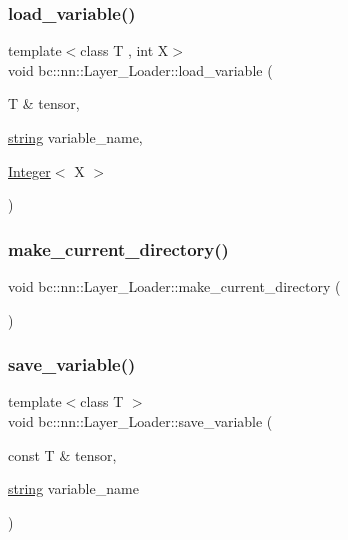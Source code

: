 \subsubsection{\texorpdfstring{load\+\_\+variable()}{load\_variable()}\hspace{0.1cm}{\footnotesize\ttfamily [4/4]}}
{\footnotesize\ttfamily template$<$class T , int X$>$ \\
void bc\+::nn\+::\+Layer\+\_\+\+Loader\+::load\+\_\+variable (\begin{DoxyParamCaption}\item[{T \&}]{tensor,  }\item[{\hyperlink{structbc_1_1string}{string}}]{variable\+\_\+name,  }\item[{\hyperlink{structbc_1_1traits_1_1Integer}{Integer}$<$ X $>$}]{ }\end{DoxyParamCaption})\hspace{0.3cm}{\ttfamily [inline]}}

\mbox{\label{structbc_1_1nn_1_1Layer__Loader_accce0f02309037abf68531b2b9f2c13d}} 
\subsubsection{\texorpdfstring{make\+\_\+current\+\_\+directory()}{make\_current\_directory()}}
{\footnotesize\ttfamily void bc\+::nn\+::\+Layer\+\_\+\+Loader\+::make\+\_\+current\+\_\+directory (\begin{DoxyParamCaption}{ }\end{DoxyParamCaption})\hspace{0.3cm}{\ttfamily [inline]}}

\mbox{\label{structbc_1_1nn_1_1Layer__Loader_a41c022ea61234a753938fcc139a2ae85}} 
\subsubsection{\texorpdfstring{save\+\_\+variable()}{save\_variable()}}
{\footnotesize\ttfamily template$<$class T $>$ \\
void bc\+::nn\+::\+Layer\+\_\+\+Loader\+::save\+\_\+variable (\begin{DoxyParamCaption}\item[{const T \&}]{tensor,  }\item[{\hyperlink{structbc_1_1string}{string}}]{variable\+\_\+name }\end{DoxyParamCaption})\hspace{0.3cm}{\ttfamily [inline]}}

